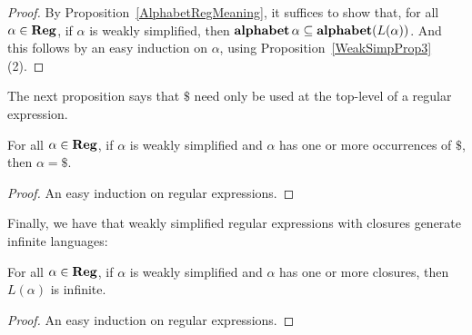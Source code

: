 \begin{proof}
By Proposition~\ref{AlphabetRegMeaning}, it suffices to show that,
for all $\alpha\in\mathbf{Reg}$, if $\alpha$ is weakly simplified, then
$\mathbf{alphabet}\,\alpha\subseteq\mathbf{alphabet}(L(\alpha))$.  And this
follows by an easy induction on $\alpha$, using
Proposition~\ref{WeakSimpProp3}(2).
\end{proof}

The next proposition says that $\$$ need only be used at the 
top-level of a regular expression.

\begin{proposition}
\label{WeakSimpProp4}
For all $\alpha\in\mathbf{Reg}$, if $\alpha$ is weakly simplified and $\alpha$ has
one or more occurrences of $\$$, then $\alpha=\$$.
\end{proposition}

\begin{proof}
An easy induction on regular expressions.
\end{proof}

Finally, we have that weakly simplified regular expressions with
closures generate infinite languages:

\begin{proposition}
For all $\alpha\in\mathbf{Reg}$, if $\alpha$ is weakly simplified and
$\alpha$ has one or more closures, then $L(\alpha)$ is
infinite.
\end{proposition}

\begin{proof}
An easy induction on regular expressions.
\end{proof}

